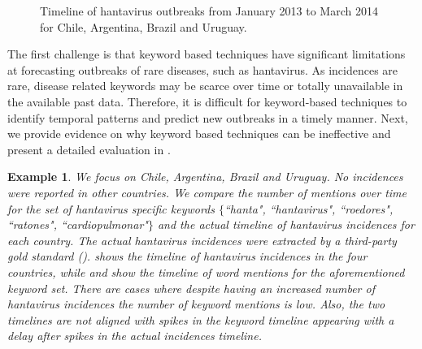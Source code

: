 \documentclass[twoside,leqno,twocolumn]{article}
\newtheorem{example}{Example}
\begin{document}
\begin{figure}[ht]
\begin{center}
\end{center}
\vspace{-10pt}
\caption{Timeline of hantavirus outbreaks from January 2013 to March 2014 for Chile, Argentina, Brazil and Uruguay.}
\label{fig:hanta_timelines}
\vspace{-10pt}
\end{figure}


The first challenge is that keyword based techniques have significant limitations at forecasting outbreaks of rare diseases, such as hantavirus. As incidences are rare, disease related keywords may be scarce over time or totally unavailable in the available past data. Therefore, it is difficult for keyword-based techniques to identify temporal patterns and predict new outbreaks in a timely manner. Next, we provide evidence on why keyword based techniques can be ineffective and present a detailed evaluation in .

\vspace{-5pt}\begin{example}
We focus on Chile, Argentina, Brazil and Uruguay. No incidences were reported in other countries. We compare the number of mentions over time for the set of hantavirus specific keywords $\{$``hanta", ``hantavirus", ``roedores", ``ratones", ``cardiopulmonar"$\}$ and the actual timeline of hantavirus incidences for each country. The actual hantavirus incidences were extracted by a third-party gold standard ().   shows the timeline of hantavirus incidences in the four countries, while  and  show the timeline of word mentions for the aforementioned keyword set. There are cases where despite having an increased number of hantavirus incidences the number of keyword mentions is low. Also, the two timelines are not aligned with spikes in the keyword timeline appearing with a delay after spikes in the actual incidences timeline.
\end{example}
\end{document}
